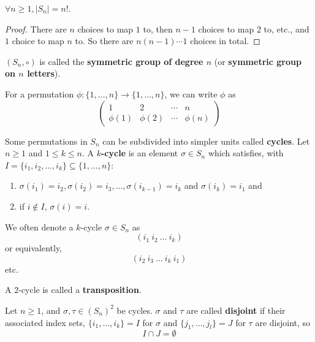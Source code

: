 \begin{lemma}
	$\forall n \ge 1, |S_n| = n!$.
\end{lemma}

\begin{proof}
	There are $n$ choices to map $1$ to, then $n - 1$ choices to map $2$ to, etc., and $1$ choice to map $n$ to. So there are $n (n - 1) \cdots 1$ choices in total.
\end{proof}

\begin{definition}
	$(S_n, \circ)$ is called the \textbf{symmetric group of degree $n$} (or \textbf{symmetric group on $n$ letters}).
\end{definition}

\begin{definition}
	For a permutation $\phi: \{ 1, \dots, n \} \rightarrow \{ 1, \dots, n \}$, we can write $\phi$ as
	\[
		\begin{pmatrix}
			1 & 2 & \cdots & n \\
			\phi(1) & \phi(2) & \cdots & \phi(n)
		\end{pmatrix}
	\]
\end{definition}

\begin{definition}
	Some permutations in $S_n$ can be subdivided into simpler units called \textbf{cycles}. Let $n \ge 1$ and $1 \le k \le n$. A \textbf{$k$-cycle} is an element $\sigma \in S_n$ which satisfies, with $I = \{ i_1, i_2, \dots, i_k \} \subseteq \{ 1, \dots, n \}$:
	\begin{enumerate}
		\item $\sigma(i_1) = i_2, \sigma(i_2) = i_3, \dots, \sigma(i_{k - 1}) = i_k$ and $\sigma(i_k) = i_1$ and
		\item if $i \notin I$, $\sigma(i) = i$.
	\end{enumerate}
	We often denote a $k$-cycle $\sigma \in S_n$ as
	\[
		(i_1 \ i_2 \ \dots \ i_k)
	\]
	or equivalently,
	\[
		(i_2 \ i_3 \ \dots \ i_k \ i_1)
	\]
	etc.
\end{definition}

\begin{definition}
	A $2$-cycle is called a \textbf{transposition}.
\end{definition}

\begin{definition}
	Let $n \ge 1$, and $\sigma, \tau \in {(S_n)}^2$ be cycles. $\sigma$ and $\tau$ are called \textbf{disjoint} if their associated index sets, $\{ i_1, \dots, i_k \} = I$ for $\sigma$ and $\{ j_1, \dots, j_l \} = J$ for $\tau$ are disjoint, so
	\[
		I \cap J = \emptyset
	\]
\end{definition}

